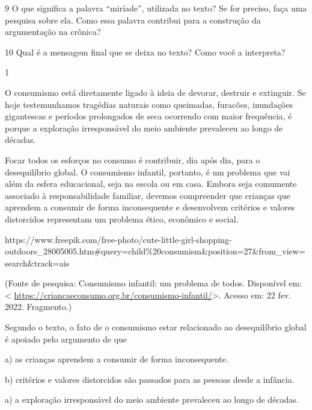 \num{9} O que significa a palavra ``miríade'', utilizada no texto? Se
for preciso, faça uma pesquisa sobre ela. Como essa palavra contribui
para a construção da argumentação na crônica?


\num{10} Qual é a mensagem final que se deixa no texto? Como você a
interpreta?



\num{1}

O consumismo está diretamente ligado à ideia de devorar, destruir e
extinguir. Se hoje testemunhamos tragédias naturais como queimadas,
furacões, inundações gigantescas e períodos prolongados de seca
ocorrendo com maior frequência, é porque a exploração irresponsável do
meio ambiente prevaleceu ao longo de décadas.

Focar todos os esforços no consumo é contribuir, dia após dia, para o
desequilíbrio global. O consumismo infantil, portanto, é um problema que
vai além da esfera educacional, seja na escola ou em casa. Embora seja
comumente associado à responsabilidade familiar, devemos compreender que
crianças que aprendem a consumir de forma inconsequente e desenvolvem
critérios e valores distorcidos representam um problema ético, econômico
e social.

https://www.freepik.com/free-photo/cute-little-girl-shopping-outdoors\_28005005.htm\#query=child\%20consumism\&position=27\&from\_view=search\&track=ais

(Fonte de pesquisa: Consumismo infantil: um problema de todos.
Disponível em: \textless{}
\url{https://criancaeconsumo.org.br/consumismo-infantil/}\textgreater.
Acesso em: 22 fev. 2022. Fragmento.)

Segundo o texto, o fato de o consumismo estar relacionado ao
desequilíbrio global é apoiado pelo argumento de que

a) as crianças aprendem a consumir de forma inconsequente.

b) critérios e valores distorcidos são passados para as pessoas desde a
infância.

a) a exploração irresponsável do meio ambiente prevaleceu ao longo de
décadas.


